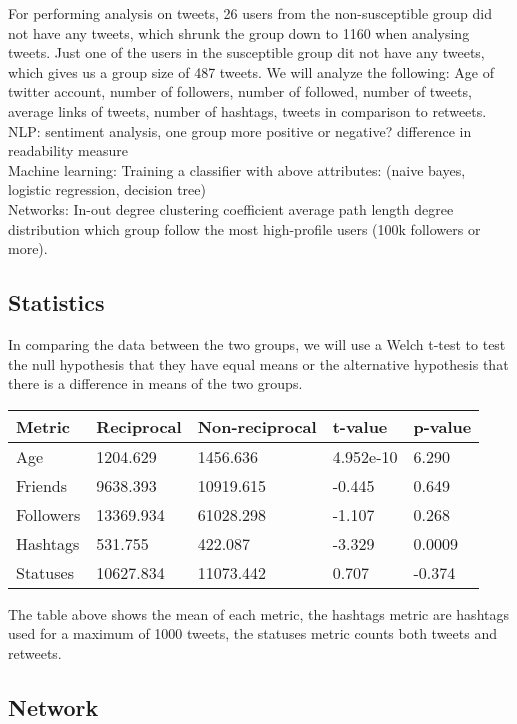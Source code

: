 \documentclass[10pt]{IEEEtran}
\begin{document}
For performing analysis on tweets, 26 users from the non-susceptible group did not have any tweets, which shrunk the group down to 1160 when analysing tweets. Just one of the users in the susceptible group dit not have any tweets, which gives us a group size of 487 tweets.
We will analyze the following: Age of twitter account, number of followers, number of followed, number of tweets, average links of tweets, number of hashtags, tweets in comparison to retweets.
\\
NLP:
sentiment analysis, one group more positive or negative?
difference in readability measure
\\
Machine learning:
Training a classifier with above attributes: (naive bayes, logistic regression, decision tree)
\\
Networks:
In-out degree
clustering coefficient
average path length
degree distribution
which group follow the most high-profile users (100k followers or more).

\subsection{Statistics}
In comparing the data between the two groups, we will use a Welch t-test to test the null hypothesis that they have equal means or the alternative hypothesis that there is a difference in means of the two groups.

\begin{table}[h]
\centering
\begin{tabular}{lllll}
\hline
Metric & Reciprocal & Non-reciprocal & t-value & p-value \\ \hline
Age & 1204.629 & 1456.636 & 4.952e-10 & 6.290 \\
Friends & 9638.393 & 10919.615 & -0.445 & 0.649 \\
Followers & 13369.934 & 61028.298 & -1.107 & 0.268 \\
Hashtags & 531.755 & 422.087 & -3.329 & 0.0009 \\
Statuses & 10627.834 & 11073.442 & 0.707 & -0.374 \\ \hline
\end{tabular}
\end{table}

The table above shows the mean of each metric, the hashtags metric are hashtags used for a maximum of 1000 tweets, the statuses metric counts both tweets and retweets.

\subsection{Network}
\end{document}
